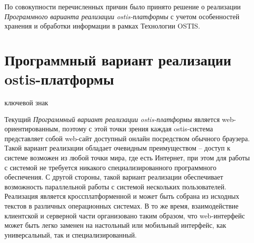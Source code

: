По совокупности перечисленных причин было принято решение о реализации \textit{Программного варианта реализации ostis-платформы}  с учетом особенностей хранения и обработки информации в рамках Технологии OSTIS.

\section{Программный вариант реализации ostis-платформы}
\label{sec_soft_platform_description}

\begin{SCn}

\begin{scnrelfromlist}{ключевой знак}
\end{scnrelfromlist}

\end{SCn}

\bigskip

Текущий \textit{Программный вариант реализации ostis-платформы} является web-ориентированным, поэтому с этой точки зрения каждая \mbox{ostis-система} представляет собой web-сайт доступный онлайн посредством обычного браузера. Такой вариант реализации обладает очевидным преимуществом -- доступ к системе возможен из любой точки мира, где есть Интернет, при этом для работы с системой не требуется никакого специализированного программного обеспечения. С другой стороны, такой вариант реализации обеспечивает возможность параллельной работы с системой нескольких пользователей. Реализация является кроссплатформенной и может быть собрана из исходных текстов в различных операционных системах. В то же время, взаимодействие клиентской и серверной части организовано таким образом, что \mbox{web-интерфейс} может быть легко заменен на настольный или мобильный интерфейс, как универсальный, так и специализированный.

